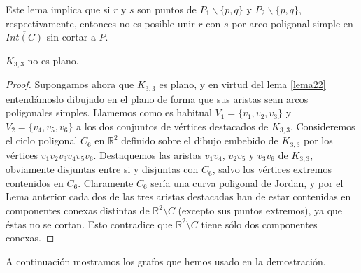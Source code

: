 \documentclass[12pt,a4paper,oldfontcommands]{memoir}
\begin{document}
	Este lema implica que si $r$ y $s$ son puntos de $P_1 \backslash \{ p,q \}$ y $P_2 \backslash \{ p,q \}$, respectivamente, entonces no es posible unir $r$ con $s$  por arco poligonal simple en $\overline{Int(C)}$ sin cortar a $P$.

\begin{theorem}\label{lema25}
	$K_{3,3}$ no es plano.
\end{theorem}
\begin{proof}
Supongamos ahora que $K_{3,3}$ es  plano, y en virtud del lema \ref{lema22} entendámoslo dibujado en el plano de forma que sus aristas sean arcos poligonales simples. Llamemos como es habitual $V_1=\{v_1,v_2,v_3\}$ y $V_2=\{v_4,v_5,v_6\}$ a los dos conjuntos de vértices destacados de $K_{3,3}$.
Consideremos el ciclo poligonal $C_6$ en $\mathbb{R}^2$ definido sobre el dibujo embebido de  $K_{3,3}$  por los vértices $v_{1}v_{2}v_{3}v_{4}v_{5}v_{6}$. Destaquemos las aristas $v_{1}v_{4}$, $v_{2}v_{5}$ y $v_{3}v_{6}$ de $K_{3,3}$, obviamente disjuntas entre si y disjuntas con $C_6$,  salvo los vértices extremos contenidos en $C_6$. Claramente $C_6$ sería una curva poligonal de Jordan, y por el Lema anterior cada dos de las tres aristas destacadas han de estar contenidas en componentes conexas distintas de $\mathbb{R}^2\setminus C$ (excepto sus puntos extremos), ya que éstas no se cortan.  Esto contradice que $\mathbb{R}^2\setminus C$ tiene sólo dos componentes conexas.
\end{proof}

A continuación mostramos  los grafos que hemos usado en la demostración.

\end{document}
